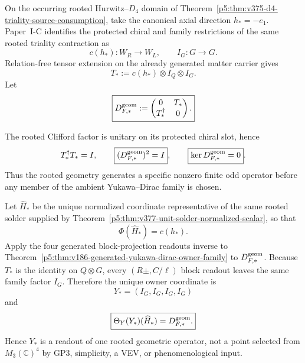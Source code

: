 \documentclass[12pt,a4paper]{article}
\begin{document}
\begin{definition}
\label{p5:def:v392-rooted-geometric-finite-odd}
On the occurring rooted Hurwitz--$D_4$ domain of
Theorem~\ref{p5:thm:v375-d4-triality-source-consumption}, take the canonical
axial direction $h_*=-e_1$.  Paper~I-C identifies the protected chiral and
family restrictions of the same rooted triality contraction as
\[
 c(h_*):W_R\to W_L,
 \qquad I_G:G\to G.
\]
Relation-free tensor extension on the already generated matter carrier gives
\[
 \boxed{T_*:=c(h_*)\otimes I_Q\otimes I_G.}
\]
Let
\[
 \boxed{D_{F,*}^{\rm geom}:=
 \begin{pmatrix}0&T_*\\T_*^\dagger&0\end{pmatrix}.}
\]
\end{definition}

\begin{proposition}
\label{p5:prop:v392-rooted-member-full-rank}
The rooted Clifford factor is unitary on its protected chiral slot, hence
\[
 T_*^\dagger T_*=I,
 \qquad \boxed{(D_{F,*}^{\rm geom})^2=I},
 \qquad \boxed{\ker D_{F,*}^{\rm geom}=0}.
\]
Thus the rooted geometry generates a specific nonzero finite odd operator
before any member of the ambient Yukawa--Dirac family is chosen.
\end{proposition}

\begin{theorem}
\label{p5:thm:v392-rooted-member-owner-readout}
Let $\widehat H_*$ be the unique normalized coordinate representative of the
same rooted solder supplied by
Theorem~\ref{p5:thm:v377-unit-solder-normalized-scalar}, so that
\[
 \Phi(\widehat H_*)=c(h_*).
\]
Apply the four generated block-projection readouts inverse to
Theorem~\ref{p5:thm:v186-generated-yukawa-dirac-owner-family} to
$D_{F,*}^{\rm geom}$.  Because $T_*$ is the identity on $Q\otimes G$, every
$(R\pm,C/\ell)$ block readout leaves the same family factor $I_G$.  Therefore
the unique owner coordinate is
\[
 \boxed{Y_*=(I_G,I_G,I_G,I_G)}
\]
and
\[
 \boxed{\Theta_Y(Y_*)(\widehat H_*)=D_{F,*}^{\rm geom}.}
\]
Hence $Y_*$ is a readout of one rooted geometric operator, not a point selected
from $M_3(\mathbb C)^4$ by GP3, simplicity, a VEV, or phenomenological input.
\end{theorem}
\end{document}
